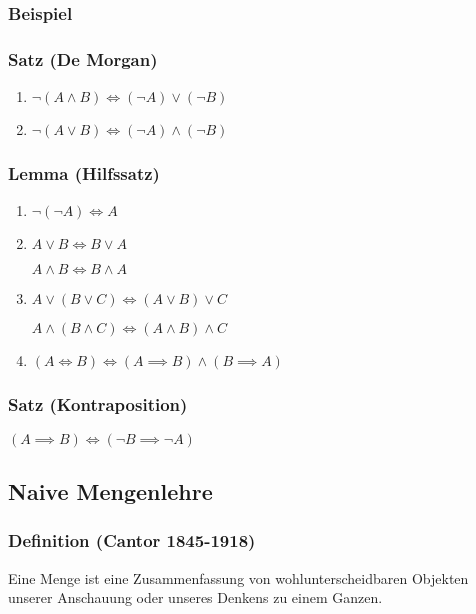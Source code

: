 \documentclass{article}
\begin{document}
      \subsubsection{Beispiel}

    \subsubsection{Satz (De Morgan)}
      \begin{enumerate}[label=(\roman*)]
        \item $\neg (A \wedge B) \iff (\neg A) \vee (\neg B)$
        \item $\neg (A \vee B) \iff (\neg A) \wedge (\neg B)$
      \end{enumerate}

    \subsubsection{Lemma (Hilfssatz)}
      \begin{enumerate}[label=(\roman*)]
        \item $\neg (\neg A) \iff A$
        \item $A \vee B \iff B \vee A$

          $A \wedge B \iff B \wedge A$
        \item $A \vee (B \vee C) \iff (A \vee B) \vee C$

          $A \wedge (B \wedge C) \iff (A \wedge B) \wedge C$
        \item $(A \iff B) \iff (A \implies B) \wedge (B \implies A)$
      \end{enumerate}

    \subsubsection{Satz (Kontraposition)}
      $\left( A \implies B \right) \iff \left( \neg B \implies \neg A \right)$

  \subsection{Naive Mengenlehre}
    \subsubsection{Definition (Cantor 1845-1918)}
      Eine Menge ist eine Zusammenfassung von wohlunterscheidbaren Objekten
      unserer Anschauung oder unseres Denkens zu einem Ganzen.
\end{document}
